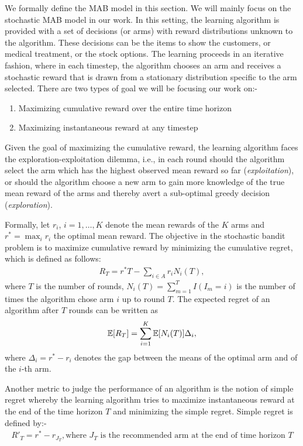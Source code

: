 We formally define the MAB model in this section. We will mainly focus on the stochastic MAB model in our work. In this setting, the learning algorithm is provided with a set of decisions (or arms) with reward distributions unknown to the algorithm. These decisions can be the items to show the customers, or medical treatment, or the stock options. The learning proceeds in an iterative fashion, where in each timestep, the algorithm chooses an arm and receives a stochastic reward that is drawn from a stationary distribution specific to the arm selected.  There are two types of goal we will be focusing our work on:-

\begin{enumerate}
\item Maximizing cumulative reward over the entire time horizon
\item Maximizing instantaneous reward at any timestep
\end{enumerate}

Given the goal of maximizing the cumulative reward, the learning algorithm faces the exploration-exploitation dilemma, i.e., in each round should the algorithm select the arm which has the highest observed mean reward so far 
(\textit{exploitation}), or should the algorithm choose a new arm to gain more knowledge of the true mean reward of the arms and thereby avert a sub-optimal greedy decision (\textit{exploration}). 

Formally, let $r_i$, $i=1,\ldots,K$ denote the mean rewards of the $K$ arms and $r^* = \max_i r_i$ the optimal mean reward. The objective in the stochastic bandit problem is to maximize cumulative reward by  minimizing the cumulative regret, which is defined as follows:
\begin{align*}
R_{T}=r^{*}T - \sum_{i\in A} r_{i}N_{i}(T),
\end{align*}
where $T$ is the number of rounds, $N_{i}(T)=\sum_{m=1}^T I(I_m=i)$ is the number of times the algorithm chose arm $i$ up to round $T$.
The expected regret of an algorithm after $T$ rounds can be written as
\begin{align*}
\mathbb{E}[R_{T}]= \sum_{i=1}^K \mathbb{E}[N_i(T)] \Delta_i,
\end{align*}
where $\Delta_{i}=r^{*}-r_{i}$ denotes the gap between the means of the optimal arm and of the $i$-th arm. 

Another metric to judge the performance of an algorithm is the notion of simple regret whereby the learning algorithm tries to maximize instantaneous reward at the end of the time horizon $T$  and minimizing the simple regret. Simple regret is defined by:-
\begin{align*}
R'_{T}=r^{*} - r_{J_{T}}, \text{where $J_{T}$ is the recommended arm at the end of time horizon $T$}
\end{align*}

